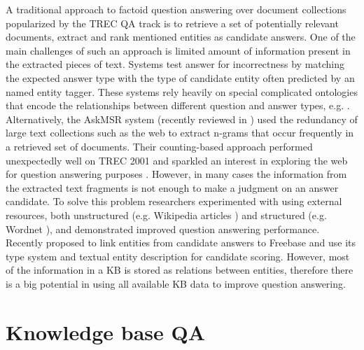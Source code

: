 A traditional approach to factoid question answering over document collections popularized by the TREC QA track is to retrieve a set of potentially relevant documents, extract and rank mentioned entities as candidate answers.
One of the main challenges of such an approach is limited amount of information present in the extracted pieces of text.
Systems test answer for incorrectness by matching the expected answer type with the type of candidate entity often predicted by an named entity tagger.
These systems rely heavily on special complicated ontologies that encode the relationships between different question and answer types, e.g. \cite{hovy2000question,LiRoth02, prager2006question}.
Alternatively, the AskMSR system \cite{brill_askmsr} (recently reviewed in \cite{tsai2015web}) used the redundancy of large text collections such as the web to extract n-grams that occur frequently in a retrieved set of documents.
Their counting-based approach performed unexpectedly well on TREC 2001 and sparkled an interest in exploring the web for question answering purposes \cite{LinK03}.
However, in many cases the information from the extracted text fragments is not enough to make a judgment on an answer candidate.
To solve this problem researchers experimented with using external resources, both unstructured (e.g. Wikipedia articles  \cite{ahn2005using, buscaldi2006mining}) and structured (e.g. Wordnet \cite{pasca2001informative}), and demonstrated improved question answering performance.
Recently \cite{Sun:2015:ODQ:2736277.2741651} proposed to link entities from candidate answers to Freebase and use its type system and textual entity description for candidate scoring.
However, most of the information in a KB is stored as relations between entities, therefore there is a big potential in using all available KB data to improve question answering.

\section{Knowledge base QA}


